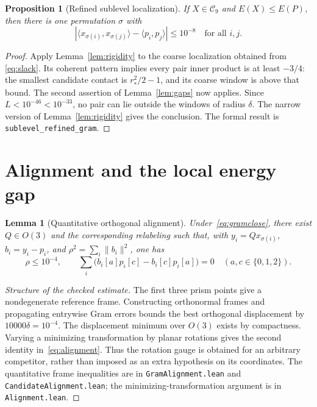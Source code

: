 \documentclass[11pt]{article}
\newtheorem{lemma}[theorem]{Lemma}
\newtheorem{proposition}[theorem]{Proposition}
\theoremstyle{remark}
\newcommand{\ip}[2]{\langle #1,#2\rangle}
\newcommand{\norm}[1]{\lVert #1\rVert}
\newcommand{\code}[1]{{\small\nolinkurl{#1}}}
\newcommand{\pathcode}[1]{\nolinkurl{#1}}
\begin{document}
\begin{proposition}[Refined sublevel localization]\label{prop:localization}
If $X\in\mathcal C_9$ and $E(X)\le E(P)$, then there is one permutation
$\sigma$ with
\begin{equation}\label{eq:gramclose}
 |\ip{x_{\sigma(i)}}{x_{\sigma(j)}}-\ip{p_i}{p_j}|\le10^{-8}
 \quad\text{for all }i,j.
\end{equation}
\end{proposition}
\begin{proof}
Apply Lemma~\ref{lem:rigidity} to the coarse localization obtained from
\eqref{eq:slack}. Its coherent pattern implies every pair inner product is at
least $-3/4$: the smallest candidate contact is $r_*^2/2-1$, and its coarse
window is above that bound. The second assertion of Lemma~\ref{lem:gaps} now
applies. Since $L<10^{-46}<10^{-33}$, no pair can lie outside the windows of
radius $\delta$. The narrow version of Lemma~\ref{lem:rigidity} gives the
conclusion. The formal result is \code{sublevel_refined_gram}.
\end{proof}

\section{Alignment and the local energy gap}\label{sec:local}
\begin{lemma}[Quantitative orthogonal alignment]\label{lem:alignment}
Under~\eqref{eq:gramclose}, there exist $Q\in O(3)$ and the corresponding
relabeling such that, with $y_i=Qx_{\sigma(i)}$, $b_i=y_i-p_i$, and
$\rho^2=\sum_i\norm{b_i}^2$, one has
\begin{equation}\label{eq:alignment}
 \rho\le10^{-4},\qquad
 \sum_i\bigl(b_i[a]p_i[c]-b_i[c]p_i[a]\bigr)=0
       \quad(a,c\in\{0,1,2\}).
\end{equation}
\end{lemma}
\begin{proof}[Structure of the checked estimate]
The first three prism points give a nondegenerate reference frame. Constructing
orthonormal frames and propagating entrywise Gram errors bounds the best
orthogonal displacement by $10000\delta=10^{-4}$. The displacement minimum
over $O(3)$ exists by compactness. Varying a minimizing transformation by
planar rotations gives the second identity in~\eqref{eq:alignment}. Thus the
rotation gauge is obtained for an arbitrary competitor, rather than imposed
as an extra hypothesis on its coordinates. The quantitative frame inequalities
are in \pathcode{GramAlignment.lean} and \pathcode{CandidateAlignment.lean};
the minimizing-transformation argument is in \pathcode{Alignment.lean}.
\end{proof}
\end{document}
